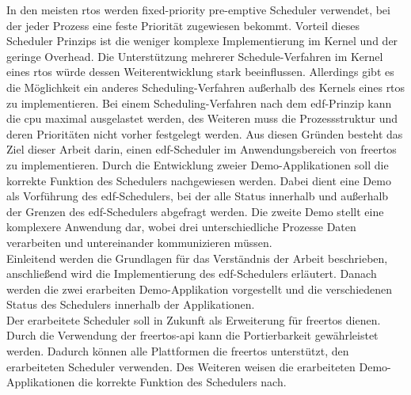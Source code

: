\documentclass[../EDF Master Thesis.tex]{subfiles}
\begin{document}
    In den meisten \ac{rtos} werden fixed-priority pre-emptive Scheduler verwendet, bei der jeder Prozess eine feste Priorität zugewiesen bekommt.
    Vorteil dieses Scheduler Prinzips ist die weniger komplexe Implementierung im Kernel und der geringe Overhead.
    Die Unterstützung mehrerer Schedule-Verfahren im Kernel eines \ac{rtos} würde dessen Weiterentwicklung stark beeinflussen.
    Allerdings gibt es die Möglichkeit ein anderes Scheduling-Verfahren außerhalb des Kernels eines \ac{rtos} zu implementieren.
    Bei einem Scheduling-Verfahren nach dem \ac{edf}-Prinzip kann die \ac{cpu} maximal ausgelastet werden, des Weiteren muss die Prozessstruktur und deren Prioritäten nicht vorher festgelegt werden.
    Aus diesen Gründen besteht das Ziel dieser Arbeit darin, einen \ac{edf}-Scheduler im Anwendungsbereich von \ac{freertos} zu implementieren.
    Durch die Entwicklung zweier Demo-Applikationen soll die korrekte Funktion des Schedulers nachgewiesen werden.
    Dabei dient eine Demo als Vorführung des \ac{edf}-Schedulers, bei der alle Status innerhalb und außerhalb der Grenzen des \ac{edf}-Schedulers abgefragt werden.
    Die zweite Demo stellt eine komplexere Anwendung dar, wobei drei unterschiedliche Prozesse Daten verarbeiten und untereinander kommunizieren müssen.\\
    Einleitend werden die Grundlagen für das Verständnis der Arbeit beschrieben, anschließend wird die Implementierung des \ac{edf}-Schedulers erläutert.
    Danach werden die zwei erarbeiten Demo-Applikation vorgestellt und die verschiedenen Status des Schedulers innerhalb der Applikationen.\\
    Der erarbeitete Scheduler soll in Zukunft als Erweiterung für \ac{freertos} dienen.
    Durch die Verwendung der \ac{freertos}-\ac{api} kann die Portierbarkeit gewährleistet werden.
    Dadurch können alle Plattformen die \ac{freertos} unterstützt, den erarbeiteten Scheduler verwenden.
    Des Weiteren weisen die erarbeiteten Demo-Applikationen die korrekte Funktion des Schedulers nach.
\end{document}

